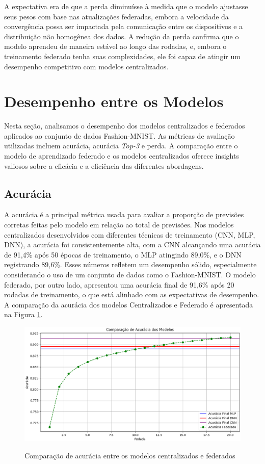 A expectativa era de que a perda diminuísse à medida que o modelo ajustasse seus pesos com base nas atualizações federadas, embora a velocidade da convergência possa ser impactada pela comunicação entre os dispositivos e a distribuição não homogênea dos dados. A redução da perda confirma que o modelo aprendeu de maneira estável ao longo das rodadas, e, embora o treinamento federado tenha suas complexidades, ele foi capaz de atingir um desempenho competitivo com modelos centralizados.

\section{Desempenho entre os Modelos}

Nesta seção, analisamos o desempenho dos modelos centralizados e federados aplicados ao conjunto de dados Fashion-MNIST. As métricas de avaliação utilizadas incluem acurácia, acurácia \textit{Top-3} e perda. A comparação entre o modelo de aprendizado federado e os modelos centralizados oferece insights valiosos sobre a eficácia e a eficiência das diferentes abordagens.

\subsection{Acurácia}

A acurácia é a principal métrica usada para avaliar a proporção de previsões corretas feitas pelo modelo em relação ao total de previsões. Nos modelos centralizados desenvolvidos com diferentes técnicas de treinamento (CNN, MLP, DNN), a acurácia foi consistentemente alta, com a CNN alcançando uma acurácia de 91,4\% após 50 épocas de treinamento, o MLP atingindo 89,0\%, e o DNN registrando 89,6\%. Esses números refletem um desempenho sólido, especialmente considerando o uso de um conjunto de dados como o Fashion-MNIST. O modelo federado, por outro lado, apresentou uma acurácia final de 91,6\% após 20 rodadas de treinamento, o que está alinhado com as expectativas de desempenho. A comparação da acurácia dos modelos Centralizados e Federado é apresentada na Figura \ref{fig:acuracyComparison}.

\begin{figure}[ht]
    \centering
    \caption{Comparação de acurácia entre os modelos centralizados e federados}
    \includegraphics[scale=0.4]{figuras/analiseResultados/acuracyComparison.eps}
    \label{fig:acuracyComparison}
\end{figure}


